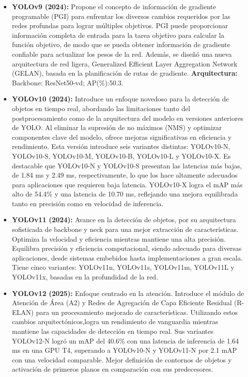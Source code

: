 \begin{itemize}
    \item \textbf{YOLOv9 (2024):} Propone el concepto de información de gradiente programable (PGI) para enfrentar los diversos cambios requeridos por las redes profundas para lograr múltiples objetivos. PGI puede proporcionar información completa de entrada para la tarea objetivo para calcular la función objetivo, de modo que se pueda obtener información de gradiente confiable para actualizar los pesos de la red. Además, se diseñó una nueva arquitectura de red ligera, Generalized Efficient Layer Aggregation Network (GELAN), basada en la planificación de rutas de gradiente. 
    \textbf{Arquitectura:} Backbone:  ResNet50-vd; AP(\%):50.3.

    \item \textbf{YOLOv10 (2024):} Introduce un enfoque novedoso para la detección de objetos en tiempo real, abordando las limitaciones tanto del postprocesamiento como de la arquitectura del modelo en versiones anteriores de YOLO. Al eliminar la supresión de no máximos (NMS) y optimizar componentes clave del modelo, ofrece mejoras significativas en eficiencia y rendimiento. Esta versión introduce seis variantes distintas: YOLOv10-N, YOLOv10-S, YOLOv10-M, YOLOv10-B, YOLOv10-L y YOLOv10-X. Es destacable que YOLOv10-N y YOLOv10-S presentan las latencias más bajas, de 1.84 ms y 2.49 ms, respectivamente, lo que los hace altamente adecuados para aplicaciones que requieren baja latencia. YOLOv10-X logra el mAP más alto de 54.4\% y una latencia de 10.70 ms, reflejando una mejora equilibrada tanto en precisión como en velocidad de inferencia.

    \item \textbf{YOLOv11 (2024): } Avance en la detección de objetos, por su arquitectura sofisticada de backbone y neck para una mejor extracción de características. Optimiza la velocidad y eficiencia mientras mantiene una alta precisión. Equilibra precisión y eficiencia computacional, siendo adecuado para diversas aplicaciones, desde sistemas embebidos hasta implementaciones a gran escala. Tiene cinco variantes: YOLOv11n, YOLOv11s, YOLOv11m, YOLOv11L y YOLOv11x, basadas en la profundidad de la red.

    \item \textbf{YOLOv12 (2025):} Enfoque centrado en la atención. Introduce el módulo de Atención de Área (A2) y Redes de Agregación de Capa Eficiente Residual (R-ELAN) para un procesamiento mejorado de características. Utilizando estos cambios arquitectónicos,logra un rendimiento de vanguardia mientras mantiene las capacidades de detección en tiempo real. Sus variantes YOLOv12-N logró un mAP del 40.6\% con una latencia de inferencia de 1.64 ms en una GPU T4, superando a YOLOv10-N y YOLOv11-N por 2.1 mAP con una velocidad comparable. Mejor definición de contornos de objetos y activación de primeros planos en comparación con sus predecesores.
    
\end{itemize}

